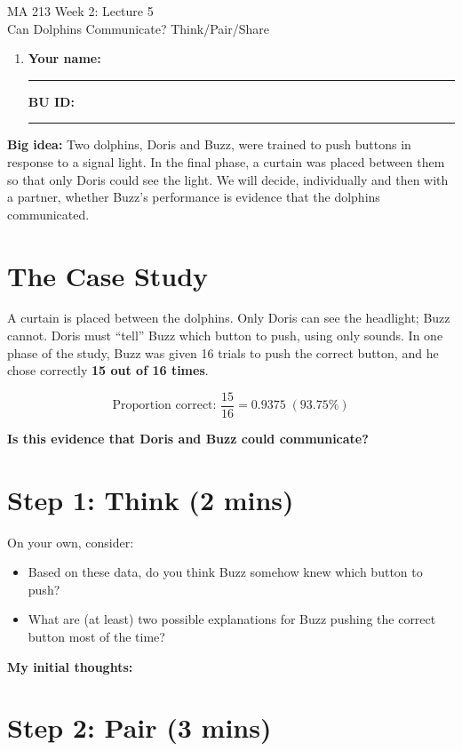 \documentclass{article}
\newcommand{\coursenumber}{MA 213}
\newcommand{\weekplaceholder}{2}
\newcommand{\lectureplaceholder}{5}
\newcommand{\lecturetitle}{Can Dolphins Communicate? Think/Pair/Share}
\newcommand{\nameblank}{\rule{1.75in}{0.4pt}}
\newcommand{\idblank}{\rule{1.55in}{0.4pt}}
\begin{document}
\begin{center}
  {\LARGE \coursenumber{} Week \weekplaceholder{}: Lecture \lectureplaceholder{}}\\
  {\large \lecturetitle{}}
\end{center}

\begin{enumerate}[label=\arabic*.,leftmargin=*,itemsep=.7em]
  \item \textbf{Your name:} \nameblank \hfill \textbf{BU ID:} \idblank
\end{enumerate}

\textbf{Big idea:} Two dolphins, Doris and Buzz, were trained to push buttons in response to a signal light. In the final phase, a curtain was placed between them so that only Doris could see the light. We will decide, individually and then with a partner, whether Buzz's performance is evidence that the dolphins communicated.

\section*{The Case Study}

A curtain is placed between the dolphins. Only Doris can see the headlight; Buzz cannot. Doris must ``tell'' Buzz which button to push, using only sounds. In one phase of the study, Buzz was given 16 trials to push the correct button, and he chose correctly \textbf{15 out of 16 times}.

\[ \text{Proportion correct: } \frac{15}{16} = 0.9375 \; (93.75\%) \]

\textbf{Is this evidence that Doris and Buzz could communicate?}

\section*{Step 1: Think (2 mins)}

On your own, consider:
\begin{itemize}
  \item Based on these data, do you think Buzz somehow knew which button to push?
  \item What are (at least) two possible explanations for Buzz pushing the correct button most of the time?
\end{itemize}

\textbf{My initial thoughts:}
\vfill
\newpage

\section*{Step 2: Pair (3 mins)}
\end{document}
